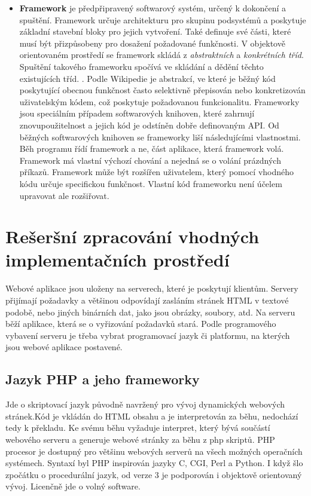 \documentclass[11pt,twoside,a4paper]{book}
\begin{document}
\begin{itemize}
\item \textbf{Framework} je předpřipravený softwarový systém, určený k dokončení a spuštění. Framework určuje architekturu pro skupinu podsystémů a poskytuje základní stavební bloky pro jejich vytvoření. Také definuje své části, které musí být přizpůsobeny pro dosažení požadované funkčnosti. V objektově orientovaném prostředí se framework skládá z \textit{abstraktních} a \textit{konkrétních tříd}. Spuštění takového frameworku spočívá ve skládání a dědění těchto existujících tříd. \cite{POSA}. Podle Wikipedie je abstrakcí, ve které je běžný kód poskytující obecnou funkčnost často selektivně přepisován nebo konkretizován uživatelským kódem, což poskytuje požadovanou funkcionalitu. Frameworky jsou speciálním případem softwarových knihoven, které zahrnují znovupoužitelnost a jejich kód je odstíněn dobře definovaným API. Od běžných softwarových knihoven se frameworky liší následujícími vlastnostmi. Běh programu řídí framework a ne, část aplikace, která framework volá. Framework má vlastní výchozí chování a nejedná se o volání prázdných příkazů. Framework může být rozšířen uživatelem, který pomocí vhodného kódu určuje specifickou funkčnost. Vlastní kód frameworku není účelem upravovat ale rozšiřovat. \cite{wiki:software-framework} 
\end{itemize}

\section{Rešeršní zpracování vhodných implementačních prostředí}

Webové aplikace jsou uloženy na serverech, které je poskytují klientům. Servery přijímají požadavky a většinou odpovídají zasláním stránek HTML v textové podobě, nebo jiných binárních dat, jako jsou obrázky, soubory, atd. Na serveru běží aplikace, která se o vyřizování požadavků stará. Podle programového vybavení serveru je třeba vybrat programovací jazyk či platformu, na kterých jsou webové aplikace postavené.

\subsection{Jazyk PHP a jeho frameworky}
Jde o skriptovací jazyk původně navržený pro vývoj dynamických webových stránek.Kód je vkládán do HTML obsahu a je interpretován za běhu, nedochází tedy k překladu.
 Ke svému běhu vyžaduje interpret, který bývá součástí webového serveru a generuje webové stránky za běhu z php skriptů. PHP procesor je dostupný pro většinu webových serverů na všech možných operačních systémech. Syntaxí byl PHP inspirován jazyky C, CGI, Perl a Python. I když šlo zpočátku o procedurální jazyk, od verze 3  je podporován i objektově orientovaný vývoj. Licenčně jde o volný software.\cite{phpmanual}
 
\end{document}

